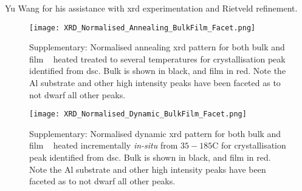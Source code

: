 \documentclass[a4paper,12pt,oneside]{article}%
\begin{document}
Yu Wang for his assistance with \acrshort{xrd} experimentation and Rietveld refinement. 






\begin{figure}[b]
	\centering
	\texttt{[image: XRD\_Normalised\_Annealing\_BulkFilm\_Facet.png]}
	\caption{Supplementary: Normalised annealing \acrshort{xrd} pattern for both bulk and film \MgZnCa~ heated treated to several temperatures for crystallisation peak identified from \acrshort{dsc}. Bulk is shown in black, and film in red. Note the Al substrate and other high intensity peaks have been faceted as to not dwarf all other peaks.}
	\label{fig:XRD_Annealing_BulkandFilm}
\end{figure}

\begin{figure}[b]
	\centering
	\texttt{[image: XRD\_Normalised\_Dynamic\_BulkFilm\_Facet.png]}
	\caption{Supplementary: Normalised dynamic \acrshort{xrd} pattern for both bulk and film \MgZnCa~ heated incrementally \textit{in-situ} from $35-185$\degree C for crystallisation peak identified from \acrshort{dsc}. Bulk is shown in black, and film in red. Note the Al substrate and other high intensity peaks have been faceted as to not dwarf all other peaks.}
	\label{fig:XRD_Dynamic_BulkandFilm}
\end{figure}
\end{document}
